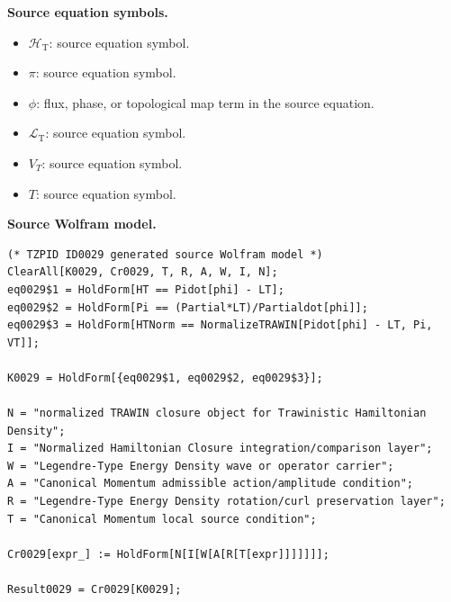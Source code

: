 \begin{minipage}[t]{0.49\linewidth}
\begingroup
\small
\raggedright
\textbf{Source equation symbols.}\par
\begin{itemize}[leftmargin=1.35em,itemsep=1pt,topsep=1pt,parsep=0pt]
    \item $\mathcal{H}_{\mathrm{T}}$: source equation symbol.
    \item $\pi$: source equation symbol.
    \item $\phi$: flux, phase, or topological map term in the source equation.
    \item $\mathcal{L}_{\mathrm{T}}$: source equation symbol.
    \item $V_{T}$: source equation symbol.
    \item $T$: source equation symbol.
\end{itemize}
\endgroup
\end{minipage}\hfill
\begin{minipage}[t]{0.47\linewidth}
\begingroup
\scriptsize
\raggedright
\textbf{Source Wolfram model.}\par
\begin{Verbatim}[fontsize=\tiny,breaklines=true,breakanywhere=true]
(* TZPID ID0029 generated source Wolfram model *)
ClearAll[K0029, Cr0029, T, R, A, W, I, N];
eq0029$1 = HoldForm[HT == Pidot[phi] - LT];
eq0029$2 = HoldForm[Pi == (Partial*LT)/Partialdot[phi]];
eq0029$3 = HoldForm[HTNorm == NormalizeTRAWIN[Pidot[phi] - LT, Pi, VT]];

K0029 = HoldForm[{eq0029$1, eq0029$2, eq0029$3}];

N = "normalized TRAWIN closure object for Trawinistic Hamiltonian Density";
I = "Normalized Hamiltonian Closure integration/comparison layer";
W = "Legendre-Type Energy Density wave or operator carrier";
A = "Canonical Momentum admissible action/amplitude condition";
R = "Legendre-Type Energy Density rotation/curl preservation layer";
T = "Canonical Momentum local source condition";

Cr0029[expr_] := HoldForm[N[I[W[A[R[T[expr]]]]]]];

Result0029 = Cr0029[K0029];
\end{Verbatim}
\endgroup
\end{minipage}

